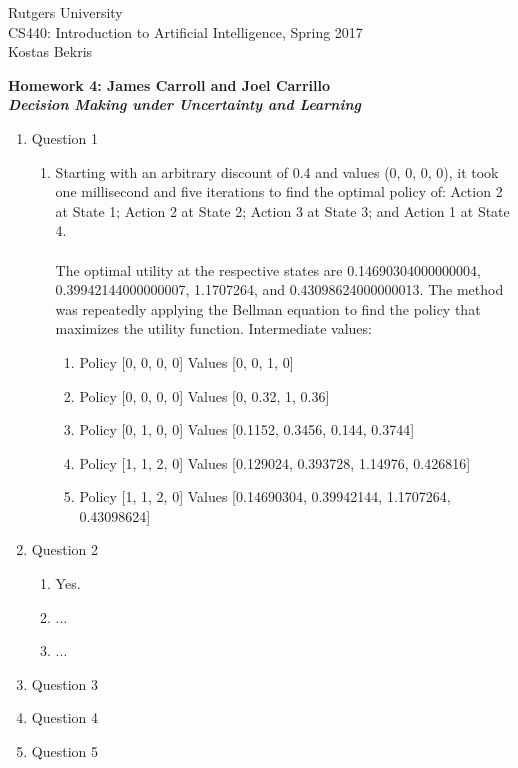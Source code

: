 \documentclass[11pt]{article}
\begin{document}
\sloppy

\noindent Rutgers University\\
CS440: Introduction to Artificial Intelligence, Spring 2017\\
Kostas Bekris\\

\begin{center}
\LARGE{\textbf{Homework 4: James Carroll and Joel Carrillo}}\\
\large{\textbf{\emph{Decision Making under Uncertainty and Learning}}}
\end{center}

\vspace{.1in}

\begin{enumerate}

\item Question 1
\begin{enumerate}
\item Starting with an arbitrary discount of 0.4 and values (0, 0, 0, 0), it took one millisecond and five iterations to find the optimal policy of: Action 2 at State 1; Action 2 at State 2; Action 3 at State 3; and Action 1 at State 4. \\ \\
The optimal utility at the respective states are 0.14690304000000004, 0.39942144000000007, 1.1707264, and 0.43098624000000013. The method was repeatedly applying the Bellman equation to find the policy that maximizes the utility function. Intermediate values:
\begin{enumerate}
\item Policy [0, 0, 0, 0] Values [0, 0, 1, 0]
\item Policy [0, 0, 0, 0] Values [0, 0.32, 1, 0.36]
\item Policy [0, 1, 0, 0] Values [0.1152, 0.3456, 0.144, 0.3744]
\item Policy [1, 1, 2, 0]  Values [0.129024, 0.393728, 1.14976, 0.426816]
\item Policy [1, 1, 2, 0]  Values [0.14690304, 0.39942144, 1.1707264, 0.43098624]
\end{enumerate}
\end{enumerate}
\item Question 2
\begin{enumerate}
\item Yes.
\item ...
\item ...
\end{enumerate}
\item Question 3
\item Question 4
\item Question 5

\end{enumerate}
\end{document}
